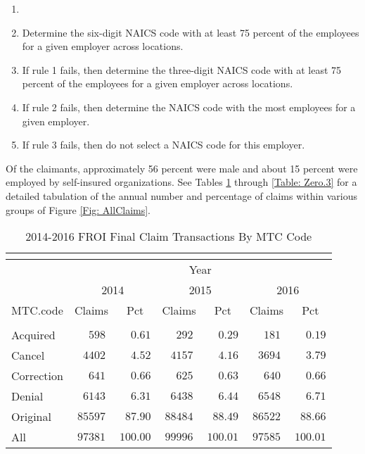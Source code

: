 \documentclass[9pt, oneside]{article}   	%
\begin{document}
\begin{enumerate}
\vspace{-0.2in}
\item[]
\item Determine the six-digit NAICS code with at least 75 percent of the employees for a given employer across locations.
\item If rule 1 fails, then determine the three-digit NAICS code with at least 75 percent of the employees for a given employer across locations.
\item If rule 2 fails, then determine the NAICS code with the most employees for a given employer.
\item If rule 3 fails, then do not select a NAICS code for this employer.
\end{enumerate}

Of the claimants, approximately 56 percent were male and about 15 percent were employed by self-insured organizations. See Tables \ref{Table: Zero} through \ref{Table: Zero.3} for a detailed tabulation of the annual number and percentage of claims within various groups of Figure \ref{Fig: AllClaims}.

\pagebreak 

\begin{longtable}{lcccccc}
\caption{2014-2016 FROI Final Claim Transactions By MTC Code}\\ 
\label{Table: Zero}\\
\hline

                  \toprule
 & \multicolumn{6}{c}{Year} \\ 
 & \multicolumn{2}{c}{2014} & \multicolumn{2}{c}{2015} & \multicolumn{2}{c}{2016} \\ 
MTC.code  & Claims & Pct & Claims & Pct & Claims & \multicolumn{1}{c}{Pct} \\ 
\midrule\\ [-1\normalbaselineskip]\hline\endhead\hline\endfoot
Acquired  & $\phantom{00}598$ & $\phantom{00}0.61$ & $\phantom{00}292$ & $\phantom{00}0.29$ & $\phantom{00}181$ & $\phantom{00}0.19$ \\
Cancel  & $\phantom{0}4402$ & $\phantom{00}4.52$ & $\phantom{0}4157$ & $\phantom{00}4.16$ & $\phantom{0}3694$ & $\phantom{00}3.79$ \\
Correction  & $\phantom{00}641$ & $\phantom{00}0.66$ & $\phantom{00}625$ & $\phantom{00}0.63$ & $\phantom{00}640$ & $\phantom{00}0.66$ \\
Denial  & $\phantom{0}6143$ & $\phantom{00}6.31$ & $\phantom{0}6438$ & $\phantom{00}6.44$ & $\phantom{0}6548$ & $\phantom{00}6.71$ \\
Original  & $85597$ & $\phantom{0}87.90$ & $88484$ & $\phantom{0}88.49$ & $86522$ & $\phantom{0}88.66$ \\
\cline{1-1} \cline{2-2} \cline{3-3} \cline{4-4} \cline{5-5} \cline{6-6} \cline{7-7} %
All  & $97381$ & $100.00$ & $99996$ & $100.01$ & $97585$ & $100.01$ \\
\hline 
\end{longtable}
\end{document}
